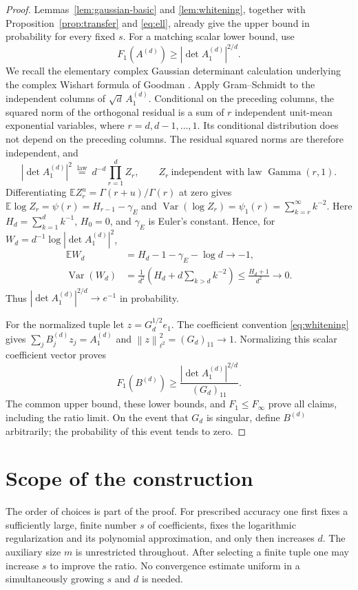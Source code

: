\documentclass[11pt]{article}
\theoremstyle{remark}
\newcommand{\E}{\mathbb E}
\newcommand{\Finf}{F_{\infty}}
\newcommand{\norm}[1]{\left\lVert#1\right\rVert}
\newcommand{\abs}[1]{\left\lvert#1\right\rvert}
\begin{document}
\begin{proof}
Lemmas~\ref{lem:gaussian-basic} and \ref{lem:whitening}, together
with Proposition~\ref{prop:transfer} and \eqref{eq:ell}, already give
the upper bound in probability for every fixed $s$.
For a matching scalar lower bound, use
\[
 F_1(A^{(d)})\geq \abs{\det A_1^{(d)}}^{2/d}.
\]
We recall the elementary complex Gaussian determinant calculation
underlying the complex Wishart formula of Goodman \cite{Goodman}.
Apply Gram--Schmidt to the independent columns of
$\sqrt d\,A_1^{(d)}$. Conditional on the preceding columns,
the squared norm of the orthogonal residual is a sum of
$r$ independent unit-mean exponential variables, where
$r=d,d-1,\ldots,1$. Its conditional distribution does not
depend on the preceding columns. The residual squared norms
are therefore independent, and
\[
 \abs{\det A_1^{(d)}}^2
   \ \stackrel{\mathrm{law}}{=}\ d^{-d}\prod_{r=1}^d Z_r,
 \qquad Z_r\ \text{independent with law }\operatorname{Gamma}(r,1).
\]
Differentiating
$\E Z_r^u=\Gamma(r+u)/\Gamma(r)$ at zero gives
$\E\log Z_r=\psi(r)=H_{r-1}-\gamma_{\!E}$ and
$\operatorname{Var}(\log Z_r)=\psi_1(r)=\sum_{k=r}^{\infty}k^{-2}$.
Here $H_d=\sum_{k=1}^d k^{-1}$, $H_0=0$, and $\gamma_{\!E}$
is Euler's constant. Hence, for
$W_d=d^{-1}\log\abs{\det A_1^{(d)}}^2$,
\begin{align*}
 \E W_d&=H_d-1-\gamma_{\!E}-\log d\longrightarrow-1,\\
 \operatorname{Var}(W_d)
   &=\frac1{d^2}
       \left(H_d+d\sum_{k>d}k^{-2}\right)
     \leq\frac{H_d+1}{d^2}\longrightarrow0.
\end{align*}
Thus $\abs{\det A_1^{(d)}}^{2/d}\to e^{-1}$ in probability.

For the normalized tuple let $z=G_d^{1/2}e_1$.
The coefficient convention \eqref{eq:whitening} gives
$\sum_jB_j^{(d)}z_j=A_1^{(d)}$ and
$\norm{z}_{\ell^2}^2=(G_d)_{11}\to1$. Normalizing this scalar
coefficient vector proves
\[
 F_1(B^{(d)})
  \geq\frac{\abs{\det A_1^{(d)}}^{2/d}}{(G_d)_{11}}.
\]
The common upper bound, these lower bounds, and
$F_1\leq\Finf$ prove all claims, including the ratio limit.
On the event that $G_d$ is singular, define $B^{(d)}$
arbitrarily; the probability of this event tends to zero.
\end{proof}

\section{Scope of the construction}

The order of choices is part of the proof. For prescribed accuracy
one first fixes a sufficiently large, finite number $s$ of
coefficients, fixes the logarithmic regularization and its polynomial
approximation, and only then increases $d$. The auxiliary size $m$
is unrestricted throughout. After selecting a finite tuple one may
increase $s$ to improve the ratio. No convergence estimate uniform
in a simultaneously growing $s$ and $d$ is needed.
\end{document}
